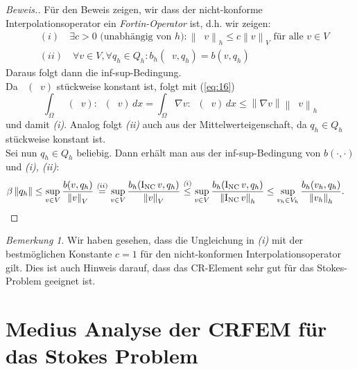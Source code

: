 \message{ !name(script.tex)}\documentclass[a4paper]{scrartcl}
\newcommand{\dx}{\,dx}
\newcommand{\vnorm}[1]{\left\lVert#1\right\rVert_V}
\newcommand{\norm}[1]{\left\lVert#1\right\rVert}
\newcommand{\hnorm}[1]{\left\lVert#1\right\rVert_h}
\DeclareMathOperator{\nablah}{\nabla_{\textit{h}}}
\DeclareMathOperator{\intOp}{I_{NC}}
\theoremstyle{plain}
\theoremstyle{definition}
\theoremstyle{remark}
\newtheorem*{remark*}{Bemerkung}
\begin{document}
\begin{proof}[Beweis.]
  Für den Beweis zeigen, wir dass der nicht-konforme
  Interpolationsoperator ein \emph{Fortin-Operator} ist, d.h. wir
  zeigen: 
 \begin{align}     
   &(i) \quad \exists c > 0 \text{ (unabhängig von } h\text{)} \colon
   \hnorm{\intOp v} \leq c \vnorm{v} \text{ für alle } v \in V \nonumber\\ 
   &(ii) \quad \forall v \in V, \forall q_h \in Q_h\colon b_h(\intOp v, q_h) = b(v, q_h) \nonumber
   \label{align:2} 
  \end{align}
  Daraus folgt dann die inf-sup-Bedingung. \\
  Da \(\nablah (\intOp v)\) stückweise konstant ist, folgt mit
  (\ref{eq:16})
  \begin{equation}
    \label{eq:18}
    \int_\Omega \nablah (\intOp v) : \nablah (\intOp v) \dx = 
    \int_\Omega \nabla v : \nablah (\intOp v) \dx \leq \norm{\nabla v}\hnorm{\intOp v}
  \end{equation}
  und damit \emph{(i)}. Analog folgt \emph{(ii)} auch aus
  der Mittelwerteigenschaft, da \(q_h \in Q_h\) stückweise konstant
  ist. \\ 
  Sei nun \(q_h \in Q_h\) beliebig. Dann erhält man aus der
  inf-sup-Bedingung von \(b(\cdot, \cdot)\) und \emph{(i), (ii)}: 
  \begin{align}
    \beta \norm{q_h} 
    &\leq \sup_{v\in V} \frac{b(v,q_h)}{\vnorm{v}}
    \overset{\emph(ii)}{=} \sup_{v\in V} \frac{b_h(\intOp v,q_h)}{\vnorm{v}}
    \overset{\emph(i)}{\leq} \sup_{v\in V} \frac{b_h(\intOp v,q_h)}{\hnorm{\intOp v}} \nonumber 
    \leq \sup_{v_h\in V_h} \frac{b_h(v_h,q_h)}{\hnorm{v_h}}. \nonumber
  \end{align}
\end{proof}

\begin{remark*}
  Wir haben gesehen, dass die Ungleichung in \emph{(i)} mit der
  bestmöglichen Konstante \(c=1\) für den nicht-konformen
  Interpolationsoperator \(\intOp\) gilt. Dies ist auch Hinweis
  darauf, dass das CR-Element sehr gut für das Stokes-Problem geeignet
  ist. 
\end{remark*}



\section{Medius Analyse der CRFEM für das Stokes Problem}
\label{sec:medius-analyse-der}
\end{document}
